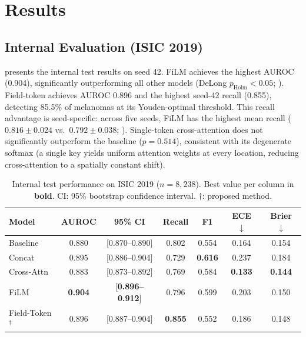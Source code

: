 \documentclass[12pt, a4paper]{article}
\begin{document}
\section{Results}
\label{sec:results}

\subsection{Internal Evaluation (ISIC 2019)}

 presents the internal test results on seed 42. FiLM achieves the highest AUROC (0.904), significantly outperforming all other models (DeLong $p_{\text{Holm}} < 0.05$; ). Field-token achieves AUROC 0.896 and the highest seed-42 recall (0.855), detecting 85.5\% of melanomas at its Youden-optimal threshold. This recall advantage is seed-specific: across five seeds, FiLM has the highest mean recall ($0.816 \pm 0.024$ vs.\ $0.792 \pm 0.038$; ). Single-token cross-attention does not significantly outperform the baseline ($p = 0.514$), consistent with its degenerate softmax (a single key yields uniform attention weights at every location, reducing cross-attention to a spatially constant shift).

\begin{table}[htbp]
\centering
\caption{Internal test performance on ISIC 2019 ($n = 8{,}238$). Best value per column in \textbf{bold}. CI: 95\% bootstrap confidence interval. $\dagger$: proposed method.}
\label{tab:internal}
\begin{tabular}{lcccccc}
\toprule
Model & AUROC & 95\% CI & Recall & F1 & ECE $\downarrow$ & Brier $\downarrow$ \\
\midrule
Baseline & 0.880 & [0.870--0.890] & 0.802 & 0.554 & 0.164 & 0.154 \\
Concat & 0.895 & [0.886--0.904] & 0.729 & \textbf{0.616} & 0.237 & 0.184 \\
Cross-Attn & 0.883 & [0.873--0.892] & 0.769 & 0.584 & \textbf{0.133} & \textbf{0.144} \\
FiLM & \textbf{0.904} & [\textbf{0.896--0.912}] & 0.796 & 0.599 & 0.203 & 0.150 \\
Field-Token$^\dagger$ & 0.896 & [0.887--0.904] & \textbf{0.855} & 0.552 & 0.186 & 0.148 \\
\bottomrule
\end{tabular}
\end{table}
\end{document}
